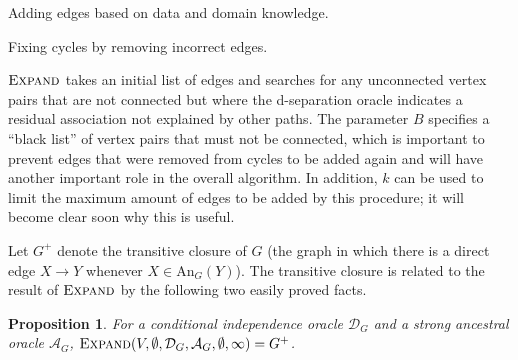 \documentclass[accepted]{uai2025} %
\newtheorem{proposition}{Proposition}
\begin{document}
\begin{algorithm}[h]
\DontPrintSemicolon
\SetAlgoLined
{}
\caption{Adding edges based on data and domain knowledge.}
\label{algo:expand}
\end{algorithm}

\begin{algorithm}[h]
\DontPrintSemicolon
\SetAlgoLined
{}
\caption{Fixing cycles by removing incorrect edges.}
\label{algo:fix_cycles}
\end{algorithm}

$\textsc{Expand}$ takes an initial list of edges and searches for 
any unconnected vertex pairs that are not connected but where the
d-separation oracle indicates a residual association not explained 
by other paths.
The parameter $B$ specifies a ``black list''
of vertex pairs that must not be connected, which is important
to prevent edges that were removed from cycles to be added again 
and will have another important role in the overall algorithm.
In addition, $k$
can be used to limit the maximum amount of edges 
to be added by this procedure; it will become clear soon why
this is useful.

Let $G^+$ denote the transitive closure of $G$ (the graph in which 
there is a direct edge $X \to Y$ whenever $X \in \textrm{An}_G(Y)$). 
The transitive closure is related to the result of $\textsc{Expand}$ 
by the following two easily proved facts.

\begin{proposition}
For a conditional independence oracle
 $\mathcal{D}_G$ and a strong ancestral oracle $\mathcal{A}_G$, 
$\textsc{Expand}(V,\emptyset,\mathcal{D}_G,\mathcal{A}_G, \emptyset, \infty)=G^+$.
\label{prop:strongexpand}
\end{proposition}
\end{document}
